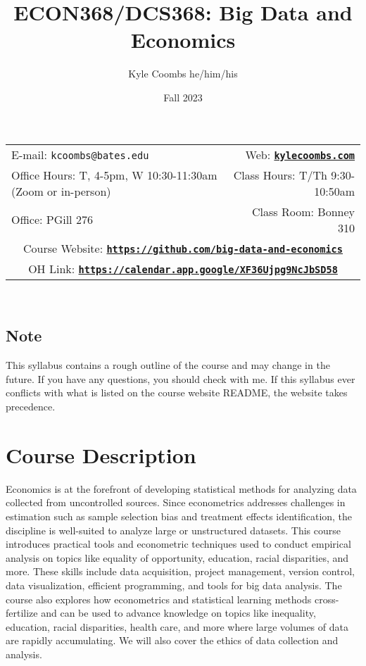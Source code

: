 \documentclass[11pt]{article}
\title{ECON368/DCS368: Big Data and Economics}
\author{Kyle Coombs he/him/his}
\date{Fall 2023}
\begin{document}
\maketitle

\begin{tabular*}{\textwidth}{@{\extracolsep{\fill}}lr}
  
E-mail: \texttt{kcoombs@bates.edu} & Web: \href{kylecoombs.com}{\tt\bf kylecoombs.com} \\

  Office Hours: T, 4-5pm, W 10:30-11:30am  (Zoom or in-person)  &  Class Hours: T/Th 9:30-10:50am \\
  Office: PGill 276 & Class Room: Bonney 310 \\ 
  \multicolumn{2}{c}{Course Website: \href{https://github.com/big-data-and-economics}{\tt\bf https://github.com/big-data-and-economics}} \\
  \multicolumn{2}{c}{OH Link: \href{https://calendar.app.google/XF36Ujpg9NcJbSD58
  }{\tt\bf https://calendar.app.google/XF36Ujpg9NcJbSD58}} \\
\hline
\end{tabular*} \\
  
\subsection*{Note}
\label{sec:note}

This syllabus contains a rough outline of the course and may change in the future. If you have any questions, you should check with me. If this syllabus ever conflicts with what is listed on the course website README, the website takes precedence.

\section*{Course Description}
\label{sec:desc}

Economics is at the forefront of developing statistical methods for analyzing data collected from uncontrolled sources. Since econometrics addresses challenges in estimation such as sample selection bias and treatment effects identification, the discipline is well-suited to analyze large or unstructured datasets. This course introduces practical tools and econometric techniques used to conduct empirical analysis on topics like equality of opportunity, education, racial disparities, and more. These skills include data acquisition, project management, version control, data visualization, efficient programming, and tools for big data analysis. The course also explores how econometrics and statistical learning methods cross-fertilize and can be used to advance knowledge on topics like inequality, education, racial disparities, health care, and more where large volumes of data are rapidly accumulating. We will also cover the ethics of data collection and analysis. 
\end{document}
